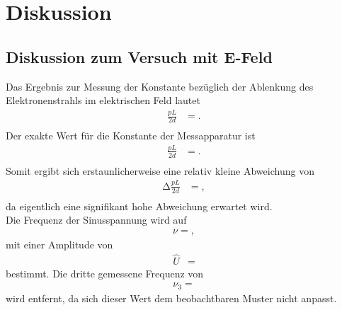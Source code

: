 \section{Diskussion}
\label{sec:Diskussion}

\subsection{Diskussion zum Versuch mit E-Feld}
Das Ergebnis zur Messung der Konstante bezüglich der Ablenkung des Elektronenstrahls im elektrischen Feld lautet
\begin{align*}
  \frac{pL}{2d} &= . \\
\end{align*}
Der exakte Wert für die Konstante der Messapparatur \cite{skript1} ist
\begin{align*}
  \frac{pL}{2d} &= . \\
\end{align*}
Somit ergibt sich erstaunlicherweise eine relativ kleine Abweichung von
\begin{align*}
  \increment{\frac{pL}{2d}} &= , \\
\end{align*}
da eigentlich eine signifikant hohe Abweichung erwartet wird.\\
Die Frequenz der Sinusspannung wird auf
\begin{align*}
  \nu = ,
\end{align*}
mit einer Amplitude von
\begin{align*}
  \hat{U} &= 
\end{align*}
bestimmt.
Die dritte gemessene Frequenz von
\begin{align*}
  \nu_3 = 
\end{align*}
wird entfernt, da sich dieser Wert dem beobachtbaren Muster nicht anpasst.

